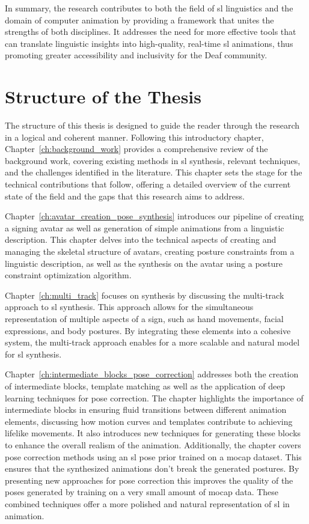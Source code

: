 \documentclass[../../main.tex]{subfiles}
\begin{document}
In summary, the research contributes to both the field of \gls{sl} linguistics and the domain of computer animation by providing a framework that unites the strengths of both disciplines. It addresses the need for more effective tools that can translate linguistic insights into high-quality, real-time \gls{sl} animations, thus promoting greater accessibility and inclusivity for the Deaf community.

\section{Structure of the Thesis}
\label{ch:introduction:structure}

The structure of this thesis is designed to guide the reader through the research in a logical and coherent manner. Following this introductory chapter, Chapter~\ref{ch:background_work} provides a comprehensive review of the background work, covering existing methods in \gls{sl} synthesis, relevant techniques, and the challenges identified in the literature. This chapter sets the stage for the technical contributions that follow, offering a detailed overview of the current state of the field and the gaps that this research aims to address.

Chapter~\ref{ch:avatar_creation_pose_synthesis} introduces our pipeline of creating a signing avatar as well as generation of simple animations from a linguistic description. This chapter delves into the technical aspects of creating and managing the skeletal structure of avatars, creating posture constraints from a linguistic description, as well as the synthesis on the avatar using a posture constraint optimization algorithm.

Chapter~\ref{ch:multi_track} focuses on synthesis by discussing the multi-track approach to \gls{sl} synthesis. This approach allows for the simultaneous representation of multiple aspects of a sign, such as hand movements, facial expressions, and body postures. By integrating these elements into a cohesive system, the multi-track approach enables for a more scalable and natural model for \gls{sl} synthesis. 

Chapter~\ref{ch:intermediate_blocks_pose_correction} addresses both the creation of intermediate blocks, template matching as well as the application of deep learning techniques for pose correction. The chapter highlights the importance of intermediate blocks in ensuring fluid transitions between different animation elements, discussing how motion curves and templates contribute to achieving lifelike movements. It also introduces new techniques for generating these blocks to enhance the overall realism of the animation. Additionally, the chapter covers pose correction methods using an \gls{sl} pose prior trained on a \gls{mocap} dataset. This ensures that the synthesized animations don't break the generated postures. By presenting new approaches for pose correction this improves the quality of the poses generated by training on a very small amount of \gls{mocap} data. These combined techniques offer a more polished and natural representation of \gls{sl} in animation.
\end{document}
